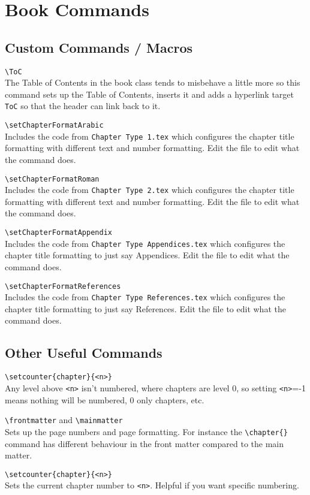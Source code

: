\documentclass[Book Template.tex]{subfiles}
\begin{document}
    \chapter{Book Commands}
        \label{ch: Book Commands}
        \thispagestyle{noheader}

        \section{Custom Commands / Macros}
            \label{sec: Custom Commands Book}

            \verb+\ToC+\\
            The Table of Contents in the book class tends to misbehave a little more so this command sets up the Table of Contents, inserts it and adds a hyperlink target \verb+ToC+ so that the header can link back to it.

            \verb+\setChapterFormatArabic+\\
            Includes the code from \verb+Chapter Type 1.tex+ which configures the chapter title formatting with different text and number formatting. Edit the file to edit what the command does.

            \verb+\setChapterFormatRoman+\\
            Includes the code from \verb+Chapter Type 2.tex+ which configures the chapter title formatting with different text and number formatting. Edit the file to edit what the command does.

            \verb+\setChapterFormatAppendix+\\
            Includes the code from \verb+Chapter Type Appendices.tex+ which configures the chapter title formatting to just say Appendices. Edit the file to edit what the command does.

            \verb+\setChapterFormatReferences+\\
            Includes the code from \verb+Chapter Type References.tex+ which configures the chapter title formatting to just say References. Edit the file to edit what the command does.

        \section{Other Useful Commands}

            \verb+\setcounter{chapter}{<n>}+\\
            Any level above \verb+<n>+ isn't numbered, where chapters are level 0, so setting \verb+<n>+=-1 means nothing will be numbered, 0 only chapters, etc.

            \verb+\frontmatter+ and \verb+\mainmatter+\\
            Sets up the page numbers and page formatting. For instance the \verb+\chapter{}+ command has different behaviour in the front matter compared to the main matter.

            \verb+\setcounter{chapter}{<n>}+\\
            Sets the current chapter number to \verb+<n>+. Helpful if you want specific numbering.
\end{document}

